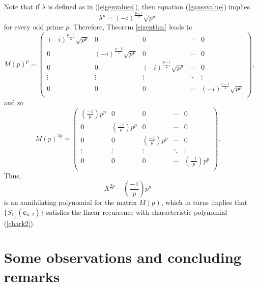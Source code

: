 Note that if $\lambda$ is defined as in (\ref{eigenvalues}), then equation (\ref{gaussvalue}) implies
\begin{equation}
 \lambda^p = (-i)^\frac{p-1}{2}\sqrt{p^p}
\end{equation}
for every odd prime $p$.  Therefore, Theorem \ref{eigenthm} leads to
\begin{equation}
 M(p)^p =\left(
\begin{array}{ccccc}
  (-i)^{\frac{p-1}{2}}\sqrt{p^p} & 0 & 0 & \cdots & 0 \\
 0 & (-i)^{\frac{p-1}{2}}\sqrt{p^p} & 0 & \cdots & 0 \\
 0 & 0 &(-i)^{\frac{p-1}{2}}\sqrt{p^p} & \cdots & 0 \\
 \vdots & \vdots & \vdots & \ddots  & \vdots \\
 0 & 0 & 0 & \cdots & (-i)^{\frac{p-1}{2}}\sqrt{p^p} \\
\end{array}
\right),
\end{equation}
and so
\begin{equation}
 M(p)^{2p} =\left(
\begin{array}{ccccc}
  \left(\frac{-1}{p}\right)p^p & 0 & 0 & \cdots & 0 \\
 0 & \left(\frac{-1}{p}\right)p^p & 0 & \cdots & 0 \\
 0 & 0 &\left(\frac{-1}{p}\right)p^p & \cdots & 0 \\
 \vdots & \vdots & \vdots & \ddots  & \vdots \\
 0 & 0 & 0 & \cdots & \left(\frac{-1}{p}\right)p^p \\
\end{array}
\right).
\end{equation}
Thus,
\begin{equation}
\label{chark2}
 X^{2p}-\left(\frac{-1}{p}\right)p^p
\end{equation}
is an annihilating polynomial for the matrix $M(p)$, which in turns implies that $\{S_{\mathbb{F}_p}(\boldsymbol{e}_{n,2})\}$ satisfies the linear recurrence with characteristic polynomial (\ref{chark2}).

\section{Some observations and concluding remarks}



